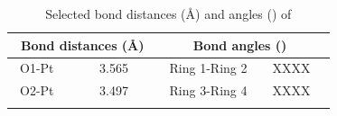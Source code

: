 \begin{table}[htp]
\caption[Selected bond distances (\AA) and angles (\degrees) of ]{Selected bond distances (\AA) and angles (\degrees) of }
\label{crystal:rhodium:lengths:oxo}
\begin{center}
\begin{tabular}{l l l l}
	\toprule
	\multicolumn{2}{l}{\bfseries{~Bond distances (\si{\angstrom})}} & \multicolumn{2}{c}{\bfseries{Bond angles (\degrees)}} \\
	\midrule		
	~O1-Pt		~~&~~3.565~~	&~~Ring 1-Ring 2		&~~XXXX~~		\\
	~O2-Pt		~~&~~3.497~~	&~~Ring 3-Ring 4		&~~XXXX~~		\\
	\bottomrule{}
\end{tabular}
\end{center}
\end{table}

